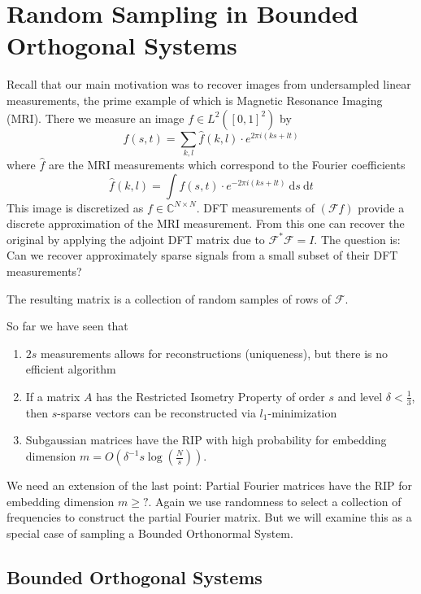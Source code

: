 \documentclass[10pt,a4paper]{article}
\theoremstyle{thmstyle}
\newcommand{\diff}{~\mathrm{d}}
\begin{document}
\section{Random Sampling in Bounded Orthogonal Systems}

Recall that our main motivation was to recover images from undersampled linear measurements, the prime example of which is Magnetic Resonance Imaging (MRI).
There we measure an image $f \in L^{2}([0, 1]^{2})$ by
\begin{equation*}
  f(s, t) = \sum_{k, l} \hat{f}(k, l) \cdot e^{2\pi i (ks + lt)}
\end{equation*}
where $\hat{f}$ are the MRI measurements which correspond to the Fourier coefficients
\begin{equation*}
  \hat{f}(k, l) = \int f(s, t) \cdot e^{-2\pi i (ks + lt)} \diff s \diff t
\end{equation*}
This image is discretized as $f \in \mathbb{C}^{N \times N}$.
DFT measurements of $(\mathcal{F}f)$ provide a discrete approximation of the MRI measurement.
From this one can recover the original by applying the adjoint DFT matrix due to $\mathcal{F}^{*}\mathcal{F} = I$.
The question is: Can we recover approximately sparse signals from a small subset of their DFT measurements?

The resulting matrix is a collection of random samples of rows of $\mathcal{F}$.

So far we have seen that
\begin{enumerate}
\item $2s$ measurements allows for reconstructions (uniqueness), but there is no efficient algorithm
\item If a matrix $A$ has the Restricted Isometry Property of order $s$ and level $\delta < \frac{1}{3}$, then $s$-sparse vectors can be reconstructed via $l_{1}$-minimization
\item Subgaussian matrices have the RIP with high probability for embedding dimension $m = O\left(\delta^{-1}s\log\left( \frac{N}{s} \right)\right)$.
\end{enumerate}
We need an extension of the last point: Partial Fourier matrices have the RIP for embedding dimension $m \ge ?$.
Again we use randomness to select a collection of frequencies to construct the partial Fourier matrix.
But we will examine this as a special case of sampling a Bounded Orthonormal System.

\subsection{Bounded Orthogonal Systems}
\end{document}
